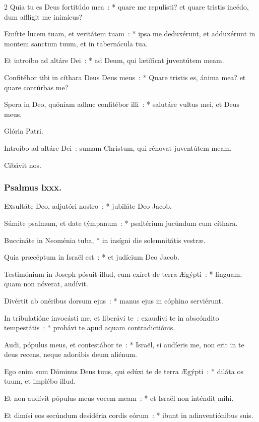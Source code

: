 \documentclass[9pt,twoside]{extarticle}
\begin{document}
\begin{multicols}{2}
Quia tu es Deus fortitúdo mea~: * quare me repulísti? et quare tristis incédo, dum afflígit me inimícus?

Emítte lucem tuam, et veritátem tuam~: * ipsa me deduxérunt, et adduxérunt in montem sanctum tuum, et in tabernácula tua.

Et introíbo ad altáre Dei~: * ad Deum, qui lætíficat juventútem meam.

Confitébor tibi in cíthara Deus Deus meus~: * Quare tristis es, ánima mea? et quare contúrbas me?

Spera in Deo, quóniam adhuc confitébor illi~: * salutáre vultus mei, et Deus meus.

Glória Patri.

\begin{tightlist}{}
\item {} Introíbo ad altáre Dei~: sumam Christum, qui rénovat juventútem meam.
\item {} Cibávit nos.
\end{tightlist}

\subsubsection*{\center Psalmus lxxx.}
\lettrine{E}xsultáte Deo, adjutóri nostro~: * jubiláte Deo Jacob.

Súmite psalmum, et date týmpanum~: * psaltérium jucúndum cum cíthara.

Buccináte in Neoménia tuba, * in insígni die solemnitátis vestræ.

Quia præcéptum in Israël est~: * et judícium Deo Jacob.

Testimónium in Joseph pósuit illud, cum exíret de terra Ægýpti~: * linguam, quam non nóverat, audívit.

Divértit ab onéribus dorsum ejus~: * manus ejus in cóphino serviérunt.

In tribulatióne invocásti me, et liberávi te~: exaudívi te in abscóndito tempestátis~: * probávi te apud aquam contradictiónis.

Audi, pópulus meus, et contestábor te~: * Israël, si audíeris me, non erit in te deus recens, neque adorábis deum aliénum.

Ego enim sum Dóminus Deus tuus, qui edúxi te de terra Ægýpti~: * diláta os tuum, et implébo illud.

Et non audívit pópulus meus vocem meam~: * et Israël non inténdit mihi.

Et dimísi eos secúndum desidéria cordis eórum~: * ibunt in adinventiónibus suis.


\end{multicols}
\end{document}
